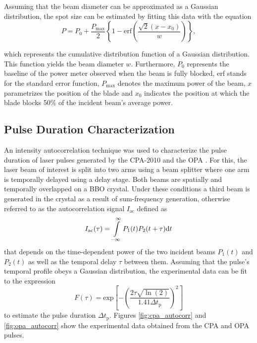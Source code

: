 Assuming that the beam diameter can be approximated as a Gaussian distribution, the spot size can be estimated by fitting this data with the equation
\begin{equation}
	\label{eq:cdf_gauss}
	P = P_0 + \dfrac{P_{\mathrm{max}}}{2} \left\{ 1 - \mathrm{erf} \left( \dfrac{\sqrt{2}(x - x_0)}{w} \right) \right\},
\end{equation}

which represents the cumulative distribution function of a Gaussian distribution. This function yields the beam diameter $w$. Furthermore, $P_0$ represents the baseline of the power meter observed when the beam is fully blocked, erf stands for the standard error function, $P_\text{max}$ denotes the maximum power of the beam, $x$ parametrizes the position of the blade and $x_0$ indicates the position at which the blade blocks 50\% of the incident beam's average power.

\subsection{Pulse Duration Characterization}
\label{section:pulse_duration}

An intensity autocorrelation technique was used to characterize the pulse duration of laser pulses generated by the CPA-2010 and the OPA \cite{paschotta2008field}. For this, the laser beam of interest is split into two arms using a beam splitter where one arm is temporally delayed using a delay stage. Both beams are spatially and temporally overlapped on a BBO crystal. Under these conditions a third beam is generated in the crystal as a result of sum-frequency generation, otherwise referred to as the autocorrelation signal $I_\text{ac}$ defined as
%
\begin{equation}
	I_\text{ac}(\tau) = \int\displaylimits_{-\infty}^{\infty} P_1(t)P_2(t+\tau) \text{d}t
\end{equation}
%
that depends on the time-dependent power of the two incident beams $P_1(t)$ and $P_2(t)$ as well as the temporal delay $\tau$ between them. Assuming that the pulse's temporal profile obeys a Gaussian distribution, the experimental data can be fit to the expression
%
\begin{equation}
	F(\tau) = \mathrm{ exp}\left[ - \left( \dfrac{2\tau\sqrt{\ln (2)}}{1.41 \Delta t_\text{p}} \right)^2\right]
	\label{eq:pulse_duration_fit}
\end{equation}
%
to estimate the pulse duration $\Delta t_\text{p}$. Figures \ref{fig:cpa_autocorr} and \ref{fig:opa_autocorr} show the experimental data obtained from the CPA and OPA pulses.

